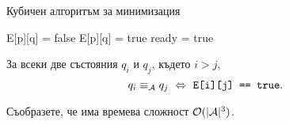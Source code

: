 
\begin{algorithm}[H]
  \caption{Кубичен алгоритъм за минимизация}
  \label{alg:minimisation-cube}
  \begin{algorithmic}[1]
    \State E[p][q] = false 
    \Else
    \State E[p][q] = true 
    \EndIf
    \EndFor
    \EndFor
    \Repeat
    \State ready = true
      
    \EndIf
    \EndFor
    \EndIf
    \EndFor
    \EndFor
  \end{algorithmic}
\end{algorithm}

\begin{proposition}
  За всеки две състояния $q_i$ и $q_j$, където $i > j$,
  \[q_i \equiv_{\mathcal{A}} q_j \ \Leftrightarrow\  \texttt{E[i][j] == true}.\]
\end{proposition}

\begin{problem}
  Съобразете, че  има времева сложност $\mathcal{O}(|\mathcal{A}|^3)$.
\end{problem}


